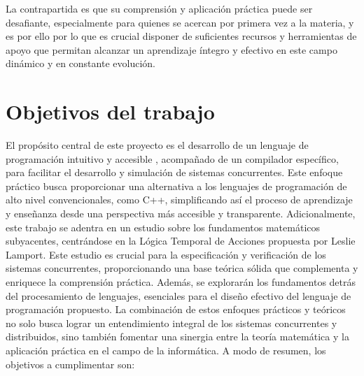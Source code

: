 La contrapartida es que su comprensión y aplicación práctica puede ser desafiante, especialmente para quienes se acercan por primera vez a la materia, y es por ello por lo que es crucial disponer de suficientes recursos y herramientas de apoyo que permitan alcanzar un aprendizaje íntegro y efectivo en este campo dinámico y en constante evolución.


\section{Objetivos del trabajo}
El propósito central de este proyecto es el desarrollo de un lenguaje de programación intuitivo y accesible , acompañado de un compilador específico, para facilitar el desarrollo y simulación de sistemas concurrentes. Este enfoque práctico busca proporcionar una alternativa a los lenguajes de programación de alto nivel convencionales, como C++, simplificando así el proceso de aprendizaje y enseñanza desde una perspectiva más accesible y transparente. Adicionalmente, este trabajo se adentra en un estudio sobre los fundamentos matemáticos subyacentes, centrándose en la Lógica Temporal de Acciones propuesta por Leslie Lamport. Este estudio es crucial para la especificación y verificación de los sistemas concurrentes, proporcionando una base teórica sólida que complementa y enriquece la comprensión práctica. Además, se explorarán los fundamentos detrás del procesamiento de lenguajes, esenciales para el diseño efectivo del lenguaje de programación propuesto. La combinación de estos enfoques prácticos y teóricos no solo busca lograr un entendimiento integral de los sistemas concurrentes y distribuidos, sino también fomentar una sinergia entre la teoría matemática y la aplicación práctica en el campo de la informática. A modo de resumen, los objetivos a cumplimentar son:

